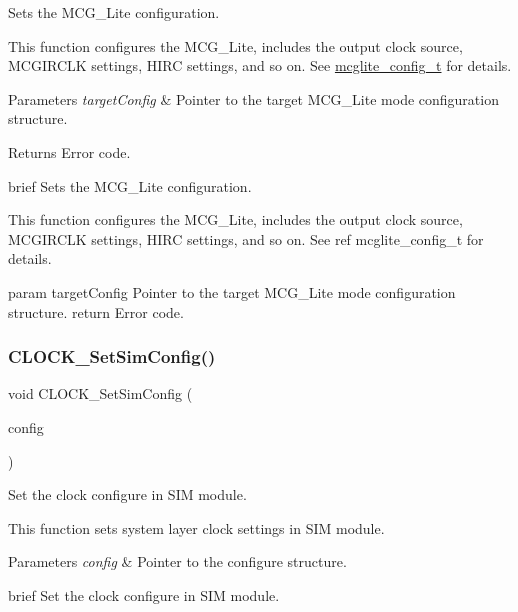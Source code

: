 Sets the M\+C\+G\+\_\+\+Lite configuration. 

This function configures the M\+C\+G\+\_\+\+Lite, includes the output clock source, M\+C\+G\+I\+R\+C\+LK settings, H\+I\+RC settings, and so on. See \mbox{\hyperlink{group__clock_gaabff5dfd46b7233a64d3f3e4b47d908d}{mcglite\+\_\+config\+\_\+t}} for details.


\begin{DoxyParams}{Parameters}
{\em target\+Config} & Pointer to the target M\+C\+G\+\_\+\+Lite mode configuration structure. \\
\hline
\end{DoxyParams}
\begin{DoxyReturn}{Returns}
Error code.
\end{DoxyReturn}
brief Sets the M\+C\+G\+\_\+\+Lite configuration.

This function configures the M\+C\+G\+\_\+\+Lite, includes the output clock source, M\+C\+G\+I\+R\+C\+LK settings, H\+I\+RC settings, and so on. See ref mcglite\+\_\+config\+\_\+t for details.

param target\+Config Pointer to the target M\+C\+G\+\_\+\+Lite mode configuration structure. return Error code. \mbox{\label{group__clock_gaf72980630bd050338cffd07f7d3b4944}} 
\subsubsection{\texorpdfstring{CLOCK\_SetSimConfig()}{CLOCK\_SetSimConfig()}}
{\footnotesize\ttfamily void C\+L\+O\+C\+K\+\_\+\+Set\+Sim\+Config (\begin{DoxyParamCaption}\item[{\mbox{\hyperlink{group__clock_gad8383426c7f9ff4119a0b6c10de5281d}{sim\+\_\+clock\+\_\+config\+\_\+t}} const $\ast$}]{config }\end{DoxyParamCaption})}



Set the clock configure in S\+IM module. 

This function sets system layer clock settings in S\+IM module.


\begin{DoxyParams}{Parameters}
{\em config} & Pointer to the configure structure.\\
\hline
\end{DoxyParams}
brief Set the clock configure in S\+IM module.

